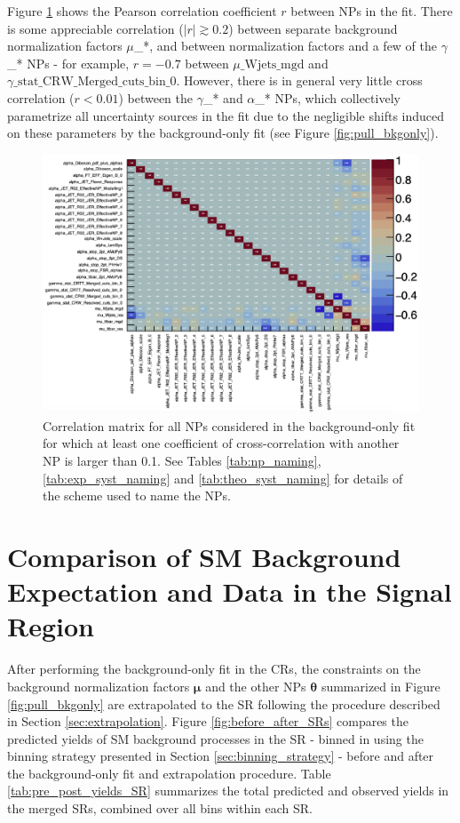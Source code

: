 Figure \ref{fig:corrs_bkgonly} shows the Pearson correlation coefficient \(r\) between NPs in the fit. There is some appreciable correlation (\(|r|\gtrsim0.2\)) between separate background normalization factors \(\mu\)\_*, and between normalization factors and a few of the \(\gamma\)\_* NPs - for example, \(r=-0.7\) between \(\mu\_\text{Wjets\_mgd}\) and \(\gamma\_\text{stat\_CRW\_Merged\_cuts\_bin\_0}\). However, there is in general very little cross correlation (\(r<0.01\)) between the \(\gamma\)\_* and \(\alpha\)\_* NPs, which collectively parametrize all uncertainty sources in the fit due to the negligible shifts induced on these parameters by the background-only fit (see Figure \ref{fig:pull_bkgonly}).

\begin{figure}[h]
  \centering
  \includegraphics[width=\textwidth]{Figures/8/BkgOnly/c_corrMatrix_RooExpandedFitResult_afterFit_edited.pdf}
  \caption[Pull plots for background-only fit]{\footnotesize{Correlation matrix for all NPs considered in the background-only fit for which at least one coefficient of cross-correlation with another NP is larger than 0.1. See Tables \ref{tab:np_naming}, \ref{tab:exp_syst_naming} and \ref{tab:theo_syst_naming} for details of the scheme used to name the NPs.}}
  \label{fig:corrs_bkgonly}
\end{figure}

\section{Comparison of SM Background Expectation and Data in the Signal Region}

After performing the background-only fit in the CRs, the constraints on the background normalization factors \(\boldsymbol{\mu}\) and the other NPs \(\boldsymbol{\theta}\) summarized in Figure \ref{fig:pull_bkgonly} are extrapolated to the SR following the procedure described in Section \ref{sec:extrapolation}. Figure \ref{fig:before_after_SRs} compares the predicted yields of SM background processes in the SR - binned in \minms using the binning strategy presented in Section \ref{sec:binning_strategy} - before and after the background-only fit and extrapolation procedure. Table \ref{tab:pre_post_yields_SR} summarizes the total predicted and observed yields in the merged SRs, combined over all bins within each SR.

